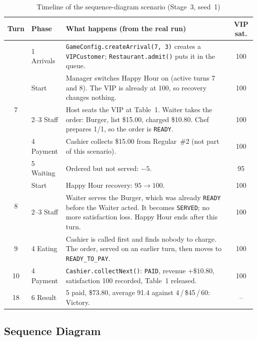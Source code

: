 \begin{table}[H]
\centering
\small
\begin{tabularx}{\textwidth}{@{}c l X c@{}}
\toprule
\textbf{Turn} & \textbf{Phase} & \textbf{What happens (from the real run)} & \textbf{VIP sat.} \\
\midrule
\multirow{5}{*}{7}
 & 1 Arrivals & \texttt{GameConfig.createArrival(7, 3)} creates a \texttt{VIPCustomer}; \texttt{Restaurant.admit()} puts it in the queue. & 100 \\
 & Start & Manager switches Happy Hour on (active turns 7 and 8). The VIP is already at 100, so recovery changes nothing. & 100 \\
 & 2--3 Staff & Host seats the VIP at Table~1. Waiter takes the order: Burger, list \$15.00, charged \$10.80. Chef prepares 1/1, so the order is \texttt{READY}. & 100 \\
 & 4 Payment & Cashier collects \$15.00 from Regular~\#2 (not part of this scenario). & 100 \\
 & 5 Waiting & Ordered but not served: $-5$. & 95 \\
\midrule
\multirow{2}{*}{8}
 & Start & Happy Hour recovery: $95 \to 100$. & 100 \\
 & 2--3 Staff & Waiter serves the Burger, which was already \texttt{READY} before the Waiter acted. It becomes \texttt{SERVED}; no more satisfaction loss. Happy Hour ends after this turn. & 100 \\
\midrule
9 & 4 Eating & Cashier is called first and finds nobody to charge. The order, served on an earlier turn, then moves to \texttt{READY\_TO\_PAY}. & 100 \\
\midrule
10 & 4 Payment & \texttt{Cashier.collectNext()}: \texttt{PAID}, revenue $+\$10.80$, satisfaction 100 recorded, Table~1 released. & 100 \\
\midrule
18 & 6 Result & 5 paid, \$73.80, average 91.4 against 4\,/\,\$45\,/\,60: Victory. & -- \\
\bottomrule
\end{tabularx}
\caption{Timeline of the sequence-diagram scenario (Stage~3, seed~1)}
\label{tab:seq-timeline}
\end{table}

\subsection{Sequence Diagram}

